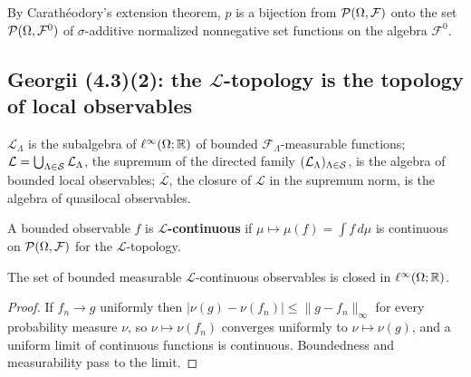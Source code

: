 \begin{remark}
    \label{rmk:lc-caratheodory}

    By Carath\'eodory's extension theorem, $p$ is a bijection from $\mathcal{P}(\Omega, \mathcal{F})$ onto
    the set $\mathcal{P}(\Omega, \mathcal{F}^0)$ of $\sigma$-additive normalized nonnegative set functions
    on the algebra $\mathcal{F}^0$.
\end{remark}

\subsection*{Georgii (4.3)(2): the $\mathcal{L}$-topology is the topology of local observables}

\begin{definition}
    \label{def:lc-local-functions}
    \leanok

    $\mathcal{L}_\Lambda$ is the subalgebra of $\ell^\infty(\Omega; \mathbb{R})$ of bounded
    $\mathcal{F}_\Lambda$-measurable functions;
    $\mathcal{L} = \bigcup_{\Lambda \in \mathcal{S}} \mathcal{L}_\Lambda$, the supremum of the directed
    family $(\mathcal{L}_\Lambda)_{\Lambda \in \mathcal{S}}$, is the algebra of bounded local observables;
    $\overline{\mathcal{L}}$, the closure of $\mathcal{L}$ in the supremum norm, is the algebra of
    quasilocal observables.
\end{definition}

\begin{definition}
    \label{def:lc-lcontinuous}
    \leanok

    A bounded observable $f$ is \textbf{$\mathcal{L}$-continuous} if
    $\mu \mapsto \mu(f) = \int f \, d\mu$ is continuous on $\mathcal{P}(\Omega, \mathcal{F})$ for the
    $\mathcal{L}$-topology.
\end{definition}

\begin{lemma}
    \label{lem:lc-isclosed-lcontinuous}
    \leanok

    The set of bounded measurable $\mathcal{L}$-continuous observables is closed in
    $\ell^\infty(\Omega; \mathbb{R})$.
\end{lemma}
\begin{proof}
    \leanok

    If $f_n \to g$ uniformly then $|\nu(g) - \nu(f_n)| \le \|g - f_n\|_\infty$ for every
    probability measure $\nu$, so $\nu \mapsto \nu(f_n)$ converges uniformly to
    $\nu \mapsto \nu(g)$, and a uniform limit of continuous functions is continuous. Boundedness
    and measurability pass to the limit.
\end{proof}

